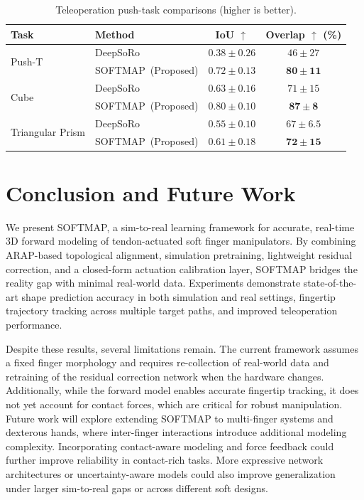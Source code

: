 \documentclass[letterpaper, 10 pt, conference]{ieeeconf}  %
\newcommand{\algname}{SOFTMAP\xspace}
\begin{document}
\begin{table}[t]
\centering
\caption{Teleoperation push-task comparisons (higher is better).}
\label{tab:task_iou_overlap_grouped}
\scriptsize
\setlength{\tabcolsep}{3pt}      %
\renewcommand{\arraystretch}{1.08}

\begin{tabular}{p{} l c c}
\toprule
\textbf{Task} & \textbf{Method} & \textbf{IoU $\uparrow$} & \textbf{Overlap $\uparrow$ (\%)} \\
\midrule
\multirow{2}{*}{Push-T}
  & DeepSoRo & $0.38\pm0.26$ & $46\pm27$ \\
  & \algname\ (Proposed) & $\mathbf{0.72\pm0.13}$ & $\mathbf{80\pm11}$ \\
\midrule
\multirow{2}{*}{Cube}
  & DeepSoRo & $0.63\pm0.16$ & $71\pm15$ \\
  & \algname\ (Proposed) & $\mathbf{0.80\pm0.10}$ & $\mathbf{87\pm8}$ \\
\midrule
\multirow{2}{*}{Triangular Prism}
  & DeepSoRo & $0.55\pm0.10$ & $67\pm6.5$ \\
  & \algname\ (Proposed) & $\mathbf{0.61\pm0.18}$ & $\mathbf{72\pm15}$ \\
\bottomrule
\end{tabular}
\end{table}

\section{Conclusion and Future Work}
We present \algname, a sim-to-real learning framework for accurate, real-time 3D forward modeling of tendon-actuated soft finger manipulators. By combining ARAP-based topological alignment, simulation pretraining, lightweight residual correction, and a closed-form actuation calibration layer, \algname bridges the reality gap with minimal real-world data. Experiments demonstrate state-of-the-art shape prediction accuracy in both simulation and real settings, fingertip trajectory tracking across multiple target paths, and improved teleoperation performance.

Despite these results, several limitations remain. The current framework assumes a fixed finger morphology and requires re-collection of real-world data and retraining of the residual correction network when the hardware changes. Additionally, while the forward model enables accurate fingertip tracking, it does not yet account for contact forces, which are critical for robust manipulation. Future work will explore extending \algname to multi-finger systems and dexterous hands, where inter-finger interactions introduce additional modeling complexity. Incorporating contact-aware modeling and force feedback could further improve reliability in contact-rich tasks. More expressive network architectures or uncertainty-aware models could also improve generalization under larger sim-to-real gaps or across different soft designs.



\end{document}
